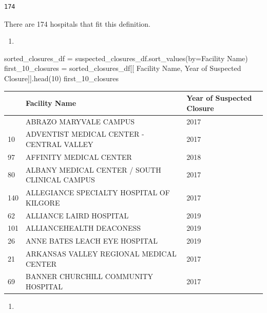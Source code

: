 \documentclass[
  letterpaper,
  DIV=11,
  numbers=noendperiod]{scrartcl}
\newenvironment{Shaded}{\begin{snugshade}}{\end{snugshade}}
\newcommand{\DecValTok}[1]{\textcolor[rgb]{0.68,0.00,0.00}{#1}}
\newcommand{\NormalTok}[1]{\textcolor[rgb]{0.00,0.23,0.31}{#1}}
\newcommand{\OperatorTok}[1]{\textcolor[rgb]{0.37,0.37,0.37}{#1}}
\newcommand{\StringTok}[1]{\textcolor[rgb]{0.13,0.47,0.30}{#1}}
\providecommand{\tightlist}{%
  \setlength{\itemsep}{0pt}\setlength{\parskip}{0pt}}\usepackage{longtable,booktabs,array}
\begin{document}
\begin{verbatim}
174
\end{verbatim}

There are 174 hospitals that fit this definition.

\begin{enumerate}
\def\labelenumi{\arabic{enumi}.}
\setcounter{enumi}{1}
\tightlist
\item
\end{enumerate}

\begin{Shaded}
\begin{Highlighting}[]
\NormalTok{sorted\_closures\_df }\OperatorTok{=}\NormalTok{ suspected\_closures\_df.sort\_values(by}\OperatorTok{=}\StringTok{\textquotesingle{}Facility Name\textquotesingle{}}\NormalTok{)}
\NormalTok{first\_10\_closures }\OperatorTok{=}\NormalTok{ sorted\_closures\_df[[}
    \StringTok{\textquotesingle{}Facility Name\textquotesingle{}}\NormalTok{, }\StringTok{\textquotesingle{}Year of Suspected Closure\textquotesingle{}}\NormalTok{]].head(}\DecValTok{10}\NormalTok{)}
\NormalTok{first\_10\_closures}
\end{Highlighting}
\end{Shaded}

\begin{longtable}[]{@{}lll@{}}
\toprule\noalign{}
& Facility Name & Year of Suspected Closure \\
\midrule\noalign{}
\endhead
\bottomrule\noalign{}
\endlastfoot
4 & ABRAZO MARYVALE CAMPUS & 2017 \\
10 & ADVENTIST MEDICAL CENTER - CENTRAL VALLEY & 2017 \\
97 & AFFINITY MEDICAL CENTER & 2018 \\
80 & ALBANY MEDICAL CENTER / SOUTH CLINICAL CAMPUS & 2017 \\
140 & ALLEGIANCE SPECIALTY HOSPITAL OF KILGORE & 2017 \\
62 & ALLIANCE LAIRD HOSPITAL & 2019 \\
101 & ALLIANCEHEALTH DEACONESS & 2019 \\
26 & ANNE BATES LEACH EYE HOSPITAL & 2019 \\
21 & ARKANSAS VALLEY REGIONAL MEDICAL CENTER & 2017 \\
69 & BANNER CHURCHILL COMMUNITY HOSPITAL & 2017 \\
\end{longtable}

\begin{enumerate}
\def\labelenumi{\arabic{enumi}.}
\setcounter{enumi}{2}
\tightlist
\item
\end{enumerate}
\end{document}
